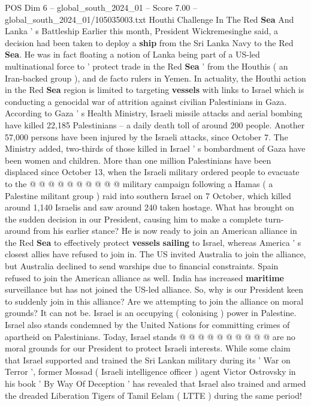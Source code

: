 \begin{textsample}{POS Dim 6 – global\_south\_2024\_01 – Score 7.00 – global\_south\_2024\_01/105035003.txt}  \label{ex:f6_pos_086}
Houthi Challenge In The Red \textbf{Sea} And Lanka ' s Battleship Earlier this month, President Wickremesinghe said, a decision had been taken to deploy a \textbf{ship} from the Sri Lanka Navy to the Red \textbf{Sea}.
He was in fact floating a notion of Lanka being part of a US-led multinational force to ' protect trade in the Red \textbf{Sea} ' from the Houthis ( an Iran-backed group ), and de facto rulers in Yemen.
In actuality, the Houthi action in the Red \textbf{Sea} region is limited to targeting \textbf{vessels} with links to Israel which is conducting a genocidal war of attrition against civilian Palestinians in Gaza.
According to Gaza ' s Health Ministry, Israeli missile attacks and aerial bombing have killed 22,185 Palestinians -- a daily death toll of around 200 people.
Another 57,000 persons have been injured by the Israeli attacks, since October 7.
The Ministry added, two-thirds of those killed in Israel ' s bombardment of Gaza have been women and children.
More than one million Palestinians have been displaced since October 13, when the Israeli military ordered people to evacuate to the @ @ @ @ @ @ @ @ @ @ military campaign following a Hamas ( a Palestine militant group ) raid into southern Israel on 7 October, which killed around 1,140 Israelis and saw around 240 taken hostage.
What has brought on the sudden decision in our President, causing him to make a complete turn-around from his earlier stance?
He is now ready to join an American alliance in the Red \textbf{Sea} to effectively protect \textbf{vessels} \textbf{sailing} to Israel, whereas America ' s closest allies have refused to join in.
The US invited Australia to join the alliance, but Australia declined to send warships due to financial constraints.
Spain refused to join the American alliance as well.
India has increased \textbf{maritime} surveillance but has not joined the US-led alliance.
So, why is our President keen to suddenly join in this alliance?
Are we attempting to join the alliance on moral grounds?
It can not be.
Israel is an occupying ( colonising ) power in Palestine.
Israel also stands condemned by the United Nations for committing crimes of apartheid on Palestinians.
Today, Israel stands @ @ @ @ @ @ @ @ @ @ are no moral grounds for our President to protect Israeli interests.
While some claim that Israel supported and trained the Sri Lankan military during its ' War on Terror ', former Mossad ( Israeli intelligence officer ) agent Victor Ostrovsky in his book ' By Way Of Deception ' has revealed that Israel also trained and armed the dreaded Liberation Tigers of Tamil Eelam ( LTTE ) during the same period!

\end{textsample}
